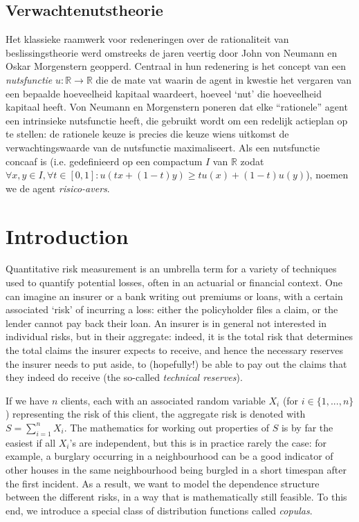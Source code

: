\documentclass{article}
\begin{document}
\subsection*{Verwachtenutstheorie}
Het klassieke raamwerk voor redeneringen over de rationaliteit van beslissingstheorie werd omstreeks de jaren veertig door John von Neumann en Oskar Morgenstern \cite{theoryOfGamesAndEconomicBehavior} geopperd. Centraal in hun redenering is het concept van een \textit{nutsfunctie} $u: \mathbb{R} \to \mathbb{R}$ die de mate vat waarin de agent in kwestie het vergaren van een bepaalde hoeveelheid kapitaal waardeert, hoeveel `nut' die hoeveelheid kapitaal heeft. Von Neumann en Morgenstern poneren dat elke ``rationele'' agent een intrinsieke nutsfunctie heeft, die gebruikt wordt om een redelijk actieplan op te stellen: de rationele keuze is precies die keuze wiens uitkomst de verwachtingswaarde van de nutsfunctie maximaliseert.  Als een nutsfunctie concaaf is (i.e. gedefinieerd op een compactum $I$ van $\mathbb{R}$ zodat $\forall x, y \in I, \forall t \in [0, 1]: u(tx + (1-t)y) \geq t u(x) + (1-t) u(y)$), noemen we de agent \textit{risico-avers}.

\newpage

\section{Introduction}
Quantitative risk measurement is an umbrella term for a variety of techniques used to quantify potential losses, often in an actuarial or financial context. One can imagine an insurer or a bank writing out premiums or loans, with a certain associated `risk' of incurring a loss: either the policyholder files a claim, or the lender cannot pay back their loan. An insurer is in general not interested in individual risks, but in their aggregate: indeed, it is the total risk that determines the total claims the insurer expects to receive, and hence the necessary reserves the insurer needs to put aside, to (hopefully!) be able to pay out the claims that they indeed do receive (the so-called \textit{technical reserves}).

If we have $n$ clients, each with an associated random variable $X_i$ (for $i \in \{1, ..., n\}$) representing the risk of this client, the aggregate risk is denoted with $S = \sum_{i=1}^n X_i$. The mathematics for working out properties of $S$ is by far the easiest if all $X_i$'s are independent, but this is in practice rarely the case: for example, a burglary occurring in a neighbourhood can be a good indicator of other houses in the same neighbourhood being burgled in a short timespan after the first incident. As a result, we want to model the dependence structure between the different risks, in a way that is mathematically still feasible. To this end, we introduce a special class of distribution functions called \textit{copulas}.
\end{document}
